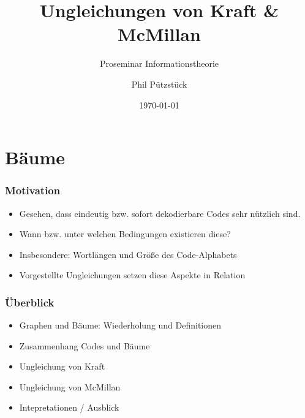 \documentclass{beamer}
\title{Ungleichungen von Kraft \& McMillan}
\subtitle{Proseminar Informationstheorie}
\author{Phil Pützstück}
\date{\today}
\begin{document}
\maketitle

\section{Bäume}
\begin{frame}
    \frametitle{Motivation}
    \begin{itemize}
        \setlength\itemsep{2em}
        \item Gesehen, dass eindeutig bzw. sofort dekodierbare Codes sehr nützlich sind.
        \item Wann bzw. unter welchen Bedingungen existieren diese?
        \item Insbesondere: Wortlängen und Größe des Code-Alphabets
        \item Vorgestellte Ungleichungen setzen diese Aspekte in Relation
    \end{itemize}
\end{frame}

\begin{frame}
    \frametitle{Überblick}
    \begin{itemize}
        \setlength\itemsep{2em}
        \item Graphen und Bäume: Wiederholung und Definitionen
        \item Zusammenhang Codes und Bäume
        \item Ungleichung von Kraft
        \item Ungleichung von McMillan
        \item Intepretationen / Ausblick
    \end{itemize}
\end{frame}
\end{document}
